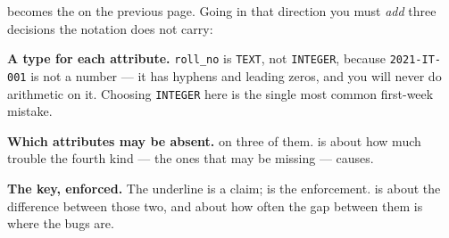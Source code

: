 \begin{examplebox}
 becomes the
 on the previous page. Going in that direction you must
\emph{add} three decisions the notation does not carry:

\begin{tight}
  \item \textbf{A type for each attribute.} \texttt{roll\_no} is
        \texttt{TEXT}, not \texttt{INTEGER}, because \texttt{2021-IT-001} is
        not a number --- it has hyphens and leading zeros, and you will never
        do arithmetic on it. Choosing \texttt{INTEGER} here is the single most
        common first-week mistake.
  \item \textbf{Which attributes may be absent.}  on three of
        them.  is about how much trouble the fourth kind ---
        the ones that may be missing --- causes.
  \item \textbf{The key, enforced.} The underline is a claim;  is the enforcement.  is about the difference
        between those two, and about how often the gap between them is where
        the bugs are.
\end{tight}
\end{examplebox}


